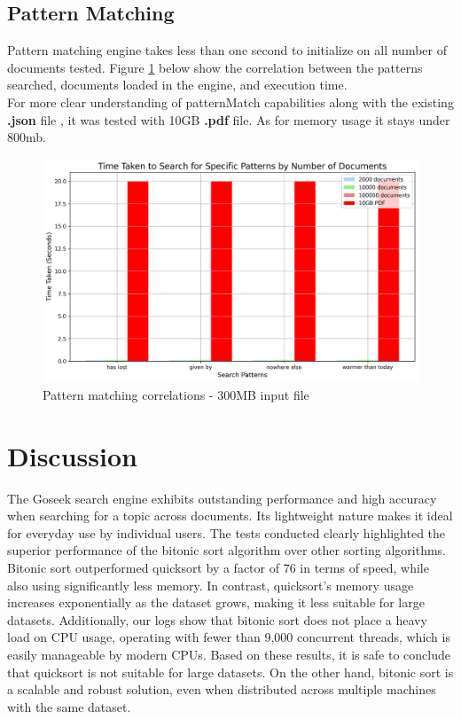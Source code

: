     \subsection{Pattern Matching}
    Pattern matching engine takes less than one second to initialize on all number of documents tested. 
    Figure \ref{fig:pm} below show the correlation between the patterns searched, documents loaded in the engine, and execution time. \\ 
    For more clear understanding of patternMatch capabilities along with the existing \textbf{.json} file , it was tested with 10GB \textbf{.pdf} file. 
    As for memory usage it stays under 800mb.
    \begin{figure}[h!]
        \centering
        \includegraphics[width=\textwidth]{big-pdf.png}
        \caption{Pattern matching correlations - 300MB input file}
        \label{fig:pm}
    \end{figure}
    \clearpage
\section{Discussion}

The Goseek search engine exhibits outstanding performance and high accuracy when searching for a topic across documents. Its lightweight nature makes it ideal for everyday use by individual users. The tests conducted clearly highlighted the superior performance of the bitonic sort algorithm over other sorting algorithms. Bitonic sort outperformed quicksort by a factor of 76 in terms of speed, while also using significantly less memory. In contrast, quicksort's memory usage increases exponentially as the dataset grows, making it less suitable for large datasets. Additionally, our logs show that bitonic sort does not place a heavy load on CPU usage, operating with fewer than 9,000 concurrent threads, which is easily manageable by modern CPUs. Based on these results, it is safe to conclude that quicksort is not suitable for large datasets. On the other hand, bitonic sort is a scalable and robust solution, even when distributed across multiple machines with the same dataset.

